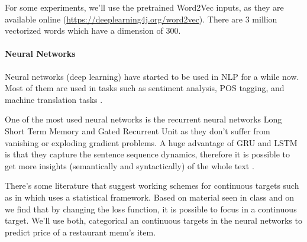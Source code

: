 \documentclass[11pt,letterpaper]{article}
\begin{document}
For some experiments, we'll use the pretrained Word2Vec inputs, as they are available online (\url{https://deeplearning4j.org/word2vec}). There are 3 million vectorized words which have a dimension of 300.

\paragraph{Neural Networks}
Neural networks (deep learning) have started to be used in NLP for a while now. Most of them are used in tasks such as sentiment analysis, POS tagging, and machine translation tasks \cite{cho2015natural}. 

One of the most used neural networks is the recurrent neural networks Long Short Term Memory and Gated Recurrent Unit \cite{cho2015natural} as they don't suffer from vanishing or exploding gradient problems. A huge advantage of GRU and LSTM is that they capture the sentence sequence dynamics, therefore it is possible to get more insights (semantically and syntactically) of the whole text \cite{gers2000learning,cho2014learning,cho2015natural}.

There's some literature that suggest working schemes for continuous targets such as in \cite{regneural1991} which uses a statistical framework. Based on material seen in class and on \cite{cho2015natural} we find that by changing the loss function, it is possible to focus in a continuous target. We'll use both, categorical an continuous targets in the neural networks to predict price of a restaurant menu's item.
\end{document}
